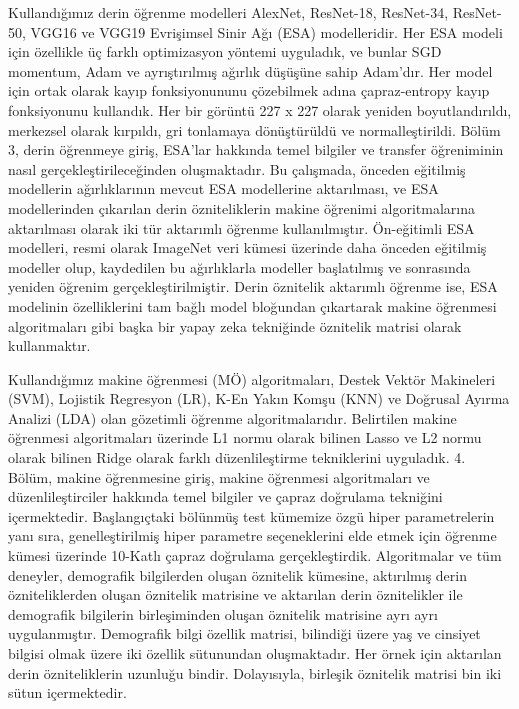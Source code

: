 Kullandığımız derin öğrenme modelleri AlexNet, ResNet-18, ResNet-34, ResNet-50, VGG16 ve VGG19 Evrişimsel Sinir Ağı (ESA) modelleridir. Her ESA modeli için özellikle üç farklı optimizasyon yöntemi uyguladık, ve bunlar SGD momentum, Adam ve ayrıştırılmış ağırlık düşüşüne sahip Adam'dır. Her model için ortak olarak kayıp fonksiyonununu çözebilmek adına çapraz-entropy kayıp fonksiyonunu kullandık. Her bir görüntü 227 x 227 olarak yeniden boyutlandırıldı, merkezsel olarak kırpıldı, gri tonlamaya dönüştürüldü ve normalleştirildi. Bölüm 3, derin öğrenmeye giriş, ESA'lar hakkında temel bilgiler ve transfer öğreniminin nasıl gerçekleştirileceğinden oluşmaktadır. Bu çalışmada, önceden eğitilmiş modellerin ağırlıklarının mevcut ESA modellerine aktarılması, ve ESA modellerinden çıkarılan derin özniteliklerin makine öğrenimi algoritmalarına aktarılması olarak iki tür aktarımlı öğrenme kullanılmıştır. Ön-eğitimli ESA modelleri, resmi olarak ImageNet veri kümesi üzerinde daha önceden eğitilmiş modeller olup, kaydedilen bu ağırlıklarla modeller başlatılmış ve sonrasında yeniden öğrenim gerçekleştirilmiştir. Derin öznitelik aktarımlı öğrenme ise, ESA modelinin özelliklerini tam bağlı model bloğundan çıkartarak makine öğrenmesi algoritmaları gibi başka bir yapay zeka tekniğinde öznitelik matrisi olarak kullanmaktır.

Kullandığımız makine öğrenmesi (MÖ) algoritmaları, Destek Vektör Makineleri (SVM), Lojistik Regresyon (LR), K-En Yakın Komşu (KNN) ve Doğrusal Ayırma Analizi (LDA) olan gözetimli öğrenme algoritmalarıdır. Belirtilen makine öğrenmesi algoritmaları üzerinde L1 normu olarak bilinen Lasso ve L2 normu olarak bilinen Ridge olarak farklı düzenlileştirme tekniklerini uyguladık. 4. Bölüm, makine öğrenmesine giriş, makine öğrenmesi algoritmaları ve düzenlileştirciler hakkında temel bilgiler ve çapraz doğrulama tekniğini içermektedir. Başlangıçtaki bölünmüş test kümemize özgü hiper parametrelerin yanı sıra, genelleştirilmiş hiper parametre seçeneklerini elde etmek için öğrenme kümesi üzerinde 10-Katlı çapraz doğrulama gerçekleştirdik. Algoritmalar ve tüm deneyler, demografik bilgilerden oluşan öznitelik kümesine, aktırılmış derin özniteliklerden oluşan öznitelik matrisine ve aktarılan derin öznitelikler ile demografik bilgilerin birleşiminden oluşan öznitelik matrisine ayrı ayrı uygulanmıştır. Demografik bilgi özellik matrisi, bilindiği üzere yaş ve cinsiyet bilgisi olmak üzere iki özellik sütunundan oluşmaktadır. Her örnek için aktarılan derin özniteliklerin uzunluğu bindir. Dolayısıyla, birleşik öznitelik matrisi bin iki sütun içermektedir.

